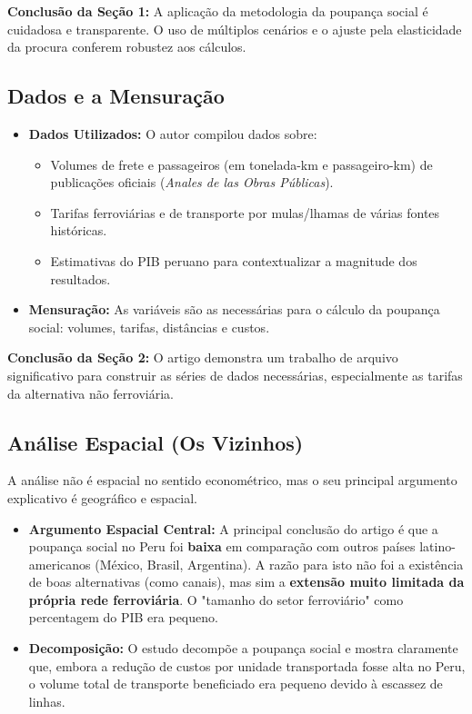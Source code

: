 \documentclass[12pt, a4paper]{article}
\begin{document}
\noindent\textbf{Conclusão da Seção 1:} A aplicação da metodologia da poupança social é cuidadosa e transparente. O uso de múltiplos cenários e o ajuste pela elasticidade da procura conferem robustez aos cálculos.

\subsection{Dados e a Mensuração}

\begin{itemize}
    \item \textbf{Dados Utilizados:} O autor compilou dados sobre:
        \begin{itemize}
            \item Volumes de frete e passageiros (em tonelada-km e passageiro-km) de publicações oficiais (\textit{Anales de las Obras Públicas}).
            \item Tarifas ferroviárias e de transporte por mulas/lhamas de várias fontes históricas.
            \item Estimativas do PIB peruano para contextualizar a magnitude dos resultados.
        \end{itemize}
    \item \textbf{Mensuração:} As variáveis são as necessárias para o cálculo da poupança social: volumes, tarifas, distâncias e custos.
\end{itemize}

\noindent\textbf{Conclusão da Seção 2:} O artigo demonstra um trabalho de arquivo significativo para construir as séries de dados necessárias, especialmente as tarifas da alternativa não ferroviária.

\subsection{Análise Espacial (Os Vizinhos)}
A análise não é espacial no sentido econométrico, mas o seu principal argumento explicativo é geográfico e espacial.
\begin{itemize}
    \item \textbf{Argumento Espacial Central:} A principal conclusão do artigo é que a poupança social no Peru foi \textbf{baixa} em comparação com outros países latino-americanos (México, Brasil, Argentina). A razão para isto não foi a existência de boas alternativas (como canais), mas sim a \textbf{extensão muito limitada da própria rede ferroviária}. O "tamanho do setor ferroviário" como percentagem do PIB era pequeno.
    \item \textbf{Decomposição:} O estudo decompõe a poupança social e mostra claramente que, embora a redução de custos por unidade transportada fosse alta no Peru, o volume total de transporte beneficiado era pequeno devido à escassez de linhas.
\end{itemize}
\end{document}
